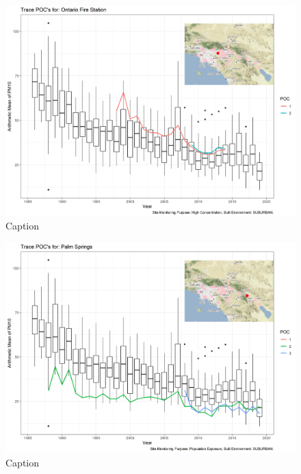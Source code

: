 \begin{figure}
    \centering
    \includegraphics[width = \textwidth]{Figures/IndividualSiteTraces/TracePOC_Ontario Fire Station.png}
    \caption{Caption}
    \label{fig:my_label}
\end{figure}

\begin{figure}
    \centering
    \includegraphics[width = \textwidth]{Figures/IndividualSiteTraces/TracePOC_Palm Springs.png}
    \caption{Caption}
    \label{fig:my_label}
\end{figure}

